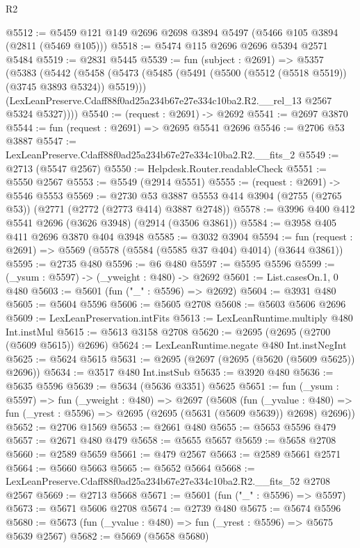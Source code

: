 \begin{lexlean}{R2}
\begin{coremodule}
@5512 := @5459 @121 @149 @2696 @2698 @3894 @5497 (@5466 @105 @3894 (@2811 (@5469 @105)))
@5518 := @5474 @115 @2696 @2696 @5394 @2571 @5484
@5519 := @2831 @5445
@5539 := fun (subject : @2691) =>
  @5357
    (@5383
      (@5442
        (@5458
          (@5473 (@5485 (@5491 (@5500 (@5512 (@5518 @5519)) (@3745 @3893 @5324)) @5519)))
          (LexLeanPreserve.Cdaff88f0ad25a234b67e27e334c10ba2.R2.__rel_13 @2567 @5324 @5327))))
@5540 := (request : @2691) -> @2692
@5541 := @2697 @3870
@5544 := fun (request : @2691) => @2695 @5541 @2696
@5546 := @2706 @53 @3887
@5547 := LexLeanPreserve.Cdaff88f0ad25a234b67e27e334c10ba2.R2.__fits_2
@5549 := @2713 (@5547 @2567)
@5550 := Helpdesk.Router.readableCheck
@5551 := @5550 @2567
@5553 := @5549 (@2914 @5551)
@5555 := (request : @2691) -> @5546 @5553
@5569 := @2730
    @53
    @3887
    @5553
    @414
    @3904
    (@2755 (@2765 @53))
    (@2771 (@2772 (@2773 @414) @3887 @2748))
@5578 := @3996 @400 @412 @5541 @2696 (@3626 @3948) (@2914 (@3506 @3861))
@5584 := @3958 @405 @411 @2696 @3870 @404 @3948
@5585 := @3032 @3904
@5594 := fun (request : @2691) => @5569 (@5578 (@5584 (@5585 @37 @404) @4014) (@3644 @3861))
@5595 := @2735 @480
@5596 := @6 @480
@5597 := @5595 @5596
@5599 := (_ysum : @5597) -> (_yweight : @480) -> @2692
@5601 := List.casesOn.{1, 0} @480
@5603 := @5601 (fun ("_" : @5596) => @2692)
@5604 := @3931 @480
@5605 := @5604 @5596
@5606 := @5605 @2708
@5608 := @5603 @5606 @2696
@5609 := LexLeanPreservation.intFits
@5613 := LexLeanRuntime.multiply @480 Int.instMul
@5615 := @5613 @3158 @2708
@5620 := @2695 (@2695 (@2700 (@5609 @5615)) @2696)
@5624 := LexLeanRuntime.negate @480 Int.instNegInt
@5625 := @5624 @5615
@5631 := @2695 (@2697 (@2695 (@5620 (@5609 @5625)) @2696))
@5634 := @3517 @480 Int.instSub
@5635 := @3920 @480
@5636 := @5635 @5596
@5639 := @5634 (@5636 @3351) @5625
@5651 := fun (_ysum : @5597) =>
  fun (_yweight : @480) =>
  @2697
    (@5608
      (fun (_yvalue : @480) =>
      fun (_yrest : @5596) => @2695 (@2695 (@5631 (@5609 @5639)) @2698) @2696))
@5652 := @2706 @1569
@5653 := @2661 @480
@5655 := @5653 @5596 @479
@5657 := @2671 @480 @479
@5658 := @5655 @5657
@5659 := @5658 @2708
@5660 := @2589 @5659
@5661 := @479 @2567
@5663 := @2589 @5661 @2571
@5664 := @5660 @5663
@5665 := @5652 @5664
@5668 := LexLeanPreserve.Cdaff88f0ad25a234b67e27e334c10ba2.R2.__fits_52 @2708 @2567
@5669 := @2713 @5668
@5671 := @5601 (fun ("_" : @5596) => @5597)
@5673 := @5671 @5606 @2708
@5674 := @2739 @480
@5675 := @5674 @5596
@5680 := @5673 (fun (_yvalue : @480) => fun (_yrest : @5596) => @5675 @5639 @2567)
@5682 := @5669 (@5658 @5680)

\end{coremodule}
\end{lexlean}
